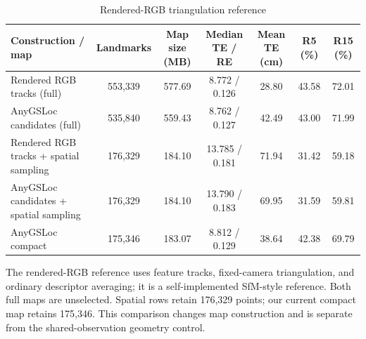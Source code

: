 \begin{table}[tp]
\centering
\footnotesize
\setlength{\tabcolsep}{2.5pt}
\renewcommand{\arraystretch}{1.1}
\renewcommand{\thetable}{S1}
\caption{Rendered-RGB triangulation reference}
\label{tab:s1}
\begin{tabular}{lcccccc}
\toprule
Construction / map & Landmarks & Map size (MB) & Median TE / RE & Mean TE (cm) & R5 (\%) & R15 (\%) \\
\midrule
Rendered RGB tracks (full) & 553,339 & 577.69 & 8.772 / 0.126 & 28.80 & 43.58 & 72.01 \\
AnyGSLoc candidates (full) & 535,840 & 559.43 & 8.762 / 0.127 & 42.49 & 43.00 & 71.99 \\
Rendered RGB tracks + spatial sampling & 176,329 & 184.10 & 13.785 / 0.181 & 71.94 & 31.42 & 59.18 \\
AnyGSLoc candidates + spatial sampling & 176,329 & 184.10 & 13.790 / 0.183 & 69.95 & 31.59 & 59.81 \\
AnyGSLoc compact & 175,346 & 183.07 & 8.812 / 0.129 & 38.64 & 42.38 & 69.79 \\
\bottomrule
\end{tabular}
\par\smallskip\begin{minipage}{0.98\linewidth}\footnotesize The rendered-RGB reference uses feature tracks, fixed-camera triangulation, and ordinary descriptor averaging; it is a self-implemented SfM-style reference. Both full maps are unselected. Spatial rows retain 176,329 points; our current compact map retains 175,346. This comparison changes map construction and is separate from the shared-observation geometry control.\end{minipage}
\end{table}
